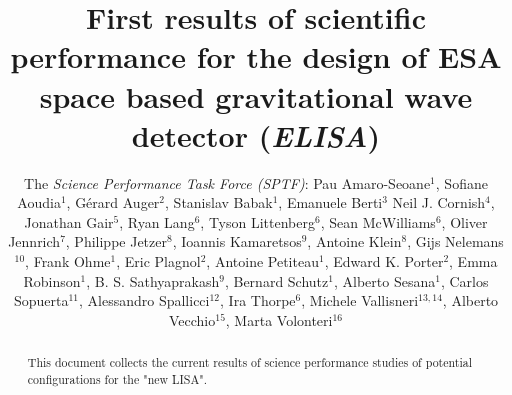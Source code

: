 \documentclass{iopart}
\begin{document}
\title
{First results of scientific performance for the design of ESA space based gravitational wave detector ({\it ELISA}) }

\author{The \emph{Science Performance Task Force (SPTF)}:
Pau Amaro-Seoane$^1$,
Sofiane Aoudia$^1$,
G\'erard Auger$^2$,
Stanislav Babak$^1$,
Emanuele Berti$^3$
Neil J. Cornish$^4$,
Jonathan Gair$^5$,
Ryan Lang$^6$,
Tyson Littenberg$^6$,
Sean McWilliams$^6$,
Oliver Jennrich$^7$,
Philippe Jetzer$^8$,
Ioannis Kamaretsos$^9$,
Antoine Klein$^8$,
Gijs Nelemans$^{10}$,
Frank Ohme$^1$,
Eric Plagnol$^2$,
Antoine Petiteau$^1$,
Edward K. Porter$^2$,
Emma Robinson$^1$,
B. S. Sathyaprakash$^9$,
Bernard Schutz$^1$,
Alberto Sesana$^1$,
Carlos Sopuerta$^{11}$,
Alessandro Spallicci$^{12}$,
Ira Thorpe$^6$,
Michele Vallisneri$^{13,14}$,
Alberto Vecchio$^{15}$,
Marta Volonteri$^{16}$
}

\address{$^1$ Max-Planck-Institut f\"ur Gravitationsphysik (Albert-Einstein-Institut), Am M\"uhlenberg 1, D-14476 Golm bei Potsdam, Germany}
\address{$^2$ APC, UMR 7164, Univ.\ Paris 7 Denis Diderot, 10, rue Alice Domon et Leonie Duquet, 75025 Paris Cedex 13, France}
\address{$^3$ University of Mississippi, USA}
\address{$^4$ Dept.\ of Physics, Montana State Univ., Bozeman, MT 59717, USA}
\address{$^5$ Inst.\ of Astronomy, Univ.\ of Cambridge, Madingley Rd., Cambridge, CB30HA, UK}
\address{$^6$ Gravitational Astrophysics Lab., NASA Goddard Space Flight Center, 8800 Greenbelt Rd., Greenbelt, MD 20771, USA}
\address{$^7$ European Space Agency}
\address{$^8$ Institute of Theoretical Physics, University of Zurich}
\address{$^9$ School of Physics and Astronomy, Cardiff Univ., 5, The Parade, Cardiff, CF243YB, UK}
\address{$^{10}$ Department of Astrophysics, Radboud University Nijmegen, The Netherlands}
\address{$^{11}$ Institute of Space Sciences (ICE-CSIC), Barcelona, Spain}
\address{$^{12}$ University of Orleans, France}
\address{$^{13}$ Jet Propulsion Laboratory, California Inst.\ of Technology, Pasadena, CA 91109, USA}
\address{$^{14}$ Theoretical Astrophysics, California Inst.\ of Technology, Pasadena, CA 91125}
\address{$^{15}$ School of Physics and Astronomy, Univ.\ of Birmingham, Edgbaston, Birmingham B152TT, UK}
\address{$^{16}$ University of Michigan}



\begin{abstract}

This document collects the current results of science performance studies of potential configurations for the "new LISA".    

\end{abstract}
\end{document}
